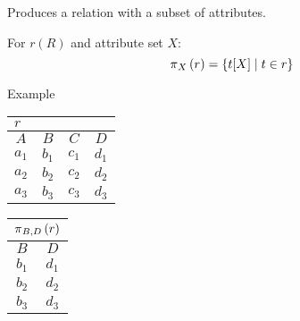 \begin{multicols}{2}
\begin{CheatsheetEntryFrame}
    \end{CheatsheetEntryFrame}

    \begin{CheatsheetEntryFrame}


        Produces a relation with a subset of attributes.

        For $r(R)$ and attribute set $X$:
        \begin{equation*}
            \operatorname{\pi}_{X}{(r)} = \left\{{t[X]} \mid {t \in r}\right\}
        \end{equation*}

        \SubsectionFrameRemoveSeparation
        \begin{RelAlgSubsection}{Example}
        \begin{center}
            {\footnotesize%
                \begin{tabular}{|cccc|}
                    \multicolumn{4}{l}{\normalsize $r$}
                        \\ \hline
                    \multicolumn{1}{|c}{$A$}
                        & \multicolumn{1}{c}{$B$}
                        & \multicolumn{1}{c}{$C$}
                        & \multicolumn{1}{c|}{$D$}
                        \\ \hline\hline
                    $a_1$ & $b_1$ & $c_1$ & $d_1$ \\
                    $a_2$ & $b_2$ & $c_2$ & $d_2$ \\
                    $a_3$ & $b_3$ & $c_3$ & $d_3$ \\ \hline
                \end{tabular}
                \qquad \qquad
                \begin{tabular}{|cc|}
                    \multicolumn{2}{l}{\normalsize $\operatorname{\pi}_{B, D}{(r)}$}
                        \\ \hline
                    \multicolumn{1}{|c}{$B$}
                        & \multicolumn{1}{c|}{$D$}
                        \\ \hline\hline
                    $b_1$ & $d_1$ \\
                    $b_2$ & $d_2$ \\
                    $b_3$ & $d_3$ \\ \hline
                \end{tabular}
            }
        \end{center}
        \end{RelAlgSubsection}


\end{CheatsheetEntryFrame}
\end{multicols}
